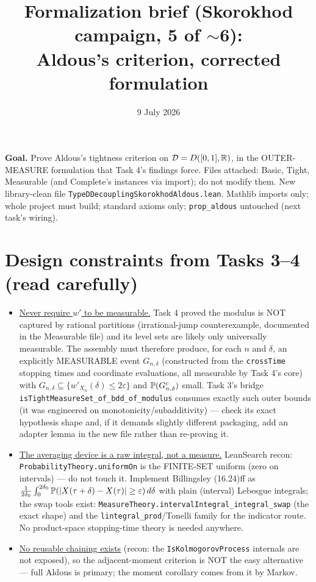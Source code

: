 \documentclass[11pt]{article}
\title{Formalization brief (Skorokhod campaign, 5 of $\sim$6):\\
Aldous's criterion, corrected formulation}
\date{9 July 2026}
\theoremstyle{plain}
\theoremstyle{remark}
\newcommand{\D}{\mathcal D}\newcommand{\eps}{\varepsilon}
\begin{document}
\maketitle

\noindent\textbf{Goal.} Prove Aldous's tightness criterion on
$\D=D([0,1],\R)$, in the OUTER-MEASURE formulation that Task 4's findings
force. Files attached: Basic, Tight, Measurable (and Complete's instances
via import); do not modify them. New library-clean file
\texttt{TypeDDecouplingSkorokhodAldous.lean}. Mathlib imports only; whole
project must build; standard axioms only; \texttt{prop\_aldous} untouched
(next task's wiring).

\section*{Design constraints from Tasks 3--4 (read carefully)}

\begin{itemize}
\item \underline{Never require $w'$ to be measurable.} Task 4 proved the
modulus is NOT captured by rational partitions (irrational-jump
counterexample, documented in the Measurable file) and its level sets are
likely only universally measurable. The assembly must therefore produce, for
each $n$ and $\delta$, an explicitly MEASURABLE event $G_{n,\delta}$
(constructed from the \texttt{crossTime} stopping times and coordinate
evaluations, all measurable by Task 4's core) with
$G_{n,\delta}\subseteq\{w'_{X_n}(\delta)\le2\eps\}$ and
$\mathbb{P}(G_{n,\delta}^c)$ small. Task 3's bridge
\texttt{isTightMeasureSet\_of\_bdd\_of\_modulus} consumes exactly such outer
bounds (it was engineered on monotonicity/subadditivity) --- check its exact
hypothesis shape and, if it demands slightly different packaging, add an
adapter lemma in the new file rather than re-proving it.
\item \underline{The averaging device is a raw integral, not a measure.}
LeanSearch recon: \texttt{ProbabilityTheory.uniformOn} is the FINITE-SET
uniform (zero on intervals) --- do not touch it. Implement Billingsley
(16.24)ff as
$\frac1{2\delta_0}\int_0^{2\delta_0}\PP(|X(\tau+\delta)-X(\tau)|\ge\eps)\,
d\delta$ with plain (interval) Lebesgue integrals; the swap tools exist:
\texttt{MeasureTheory.intervalIntegral\_integral\_swap} (the exact shape) and
the \texttt{lintegral\_prod}/Tonelli family for the indicator route. No
product-space stopping-time theory is needed anywhere.
\item \underline{No reusable chaining exists} (recon: the
\texttt{IsKolmogorovProcess} internals are not exposed), so the
adjacent-moment criterion is NOT the easy alternative --- full Aldous is
primary; the moment corollary comes from it by Markov.
\end{itemize}
\end{document}
